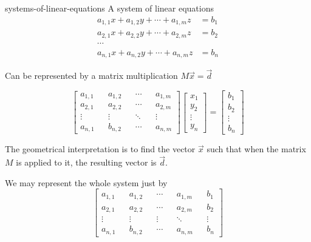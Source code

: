 \documentclass[preview]{standalone}
\begin{document}
\begin{snippet}{systems-of-linear-equations}
    A system of linear equations
    \begin{align*}
        a_{1, 1}x + a_{1, 2}y + \cdots + a_{1, m}z &= b_1 \\
        a_{2, 1}x + a_{2, 2}y + \cdots + a_{2, m}z &= b_2 \\
        \cdots \\
        a_{n, 1}x + a_{n, 2}y + \cdots + a_{n, m}z &= b_n
    \end{align*}

    Can be represented by a matrix multiplication \(M\vec{x}=\vec{d}\)

    \[
        \begin{bmatrix} 
            a_{1, 1} && a_{1, 2} && \cdots && a_{1, m} \\
            a_{2, 1} && a_{2, 2} && \cdots && a_{2, m} \\
            \vdots && \vdots && \ddots && \vdots \\
            a_{n, 1} && b_{n, 2} && \cdots && a_{n, m}
        \end{bmatrix}
        \begin{bmatrix}
            x_1 \\ y_2 \\ \vdots \\ y_n
        \end{bmatrix}
        =
        \begin{bmatrix}
            b_1 \\ b_2 \\ \vdots \\ b_n
        \end{bmatrix}
    \]

    The geometrical interpretation is to find the vector \(\vec{x}\)
    such that when the matrix \(M\) is applied to it, the resulting vector is \(\vec{d}\).

    We may represent the whole system just by
    \[
        \begin{bmatrix} 
            a_{1, 1} && a_{1, 2} && \cdots && a_{1, m} && b_1 \\
            a_{2, 1} && a_{2, 2} && \cdots && a_{2, m} && b_2 \\
            \vdots && \vdots && \vdots && \ddots && \vdots \\
            a_{n, 1} && b_{n, 2} && \cdots && a_{n, m} && b_n
        \end{bmatrix}
    \]
\end{snippet}
\end{document}
